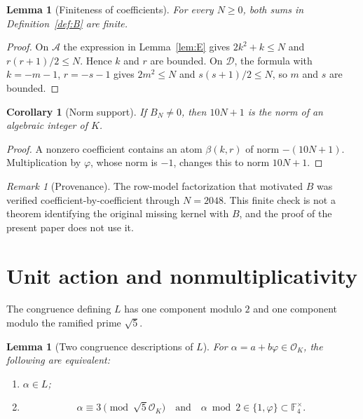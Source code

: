 \documentclass[12pt]{amsart}
\newtheorem{lemma}[theorem]{Lemma}
\newtheorem{corollary}[theorem]{Corollary}
\theoremstyle{definition}
\theoremstyle{remark}
\newtheorem{remark}[theorem]{Remark}
\newcommand{\FF}{\mathbb{F}}
\newcommand{\OK}{\mathcal{O}_K}
\newcommand{\ph}{\varphi}
\newcommand{\Acone}{\mathcal{A}}
\newcommand{\Dcone}{\mathcal{D}}
\begin{document}
\begin{lemma}[Finiteness of coefficients]\label{lem:finite}
For every $N\geq0$, both sums in Definition~\ref{def:B} are finite.
\end{lemma}

\begin{proof}
On $\Acone$ the expression in Lemma~\ref{lem:E} gives
$2k^2+k\leq N$ and $r(r+1)/2\leq N$.  Hence $k$ and $r$ are bounded.
On $\Dcone$, the formula with $k=-m-1$, $r=-s-1$ gives
$2m^2\leq N$ and $s(s+1)/2\leq N$, so $m$ and $s$ are bounded.
\end{proof}

\begin{corollary}[Norm support]\label{cor:norm-support}
If $B_N\neq0$, then $10N+1$ is the norm of an algebraic integer of
$K$.
\end{corollary}

\begin{proof}
A nonzero coefficient contains an atom $\beta(k,r)$ of norm
$-(10N+1)$.  Multiplication by $\ph$, whose norm is $-1$, changes this
to norm $10N+1$.
\end{proof}

\begin{remark}[Provenance]
The row-model factorization that motivated $B$ was verified
coefficient-by-coefficient through $N=2048$.  This finite check is not
a theorem identifying the original missing kernel with $B$, and the
proof of the present paper does not use it.
\end{remark}

\section{Unit action and nonmultiplicativity}\label{sec:units}

The congruence defining $L$ has one component modulo $2$ and one
component modulo the ramified prime $\sqrt5$.

\begin{lemma}[Two congruence descriptions of $L$]\label{lem:L-CRT}
For $\alpha=a+b\ph\in\OK$, the following are equivalent:
\begin{enumerate}
\item $\alpha\in L$;
\item
\[
  \alpha\equiv3\pmod{\sqrt5\OK}
  \quad\text{and}\quad
  \alpha\bmod2\in\{1,\ph\}\subset\FF_4^\times.
\]
\end{enumerate}
\end{lemma}
\end{document}
